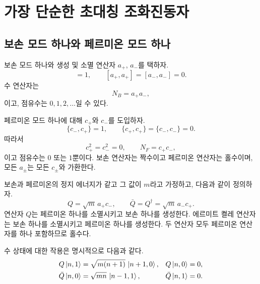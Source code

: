 \section{가장 단순한 초대칭 조화진동자}

\subsection{보손 모드 하나와 페르미온 모드 하나}

보손 모드 하나와 생성 및 소멸 연산자 \(a_+\), \(a_-\)를 택하자.
\begin{equation}
[a_-,a_+]=1,
\qquad
[a_+,a_+]=[a_-,a_-]=0.
\end{equation}
수 연산자는
\begin{equation}
N_B=a_+a_-,
\end{equation}
이고, 점유수는 \(0,1,2,\ldots\)일 수 있다.

페르미온 모드 하나에 대해 \(c_+\)와 \(c_-\)를 도입하자.
\begin{equation}
\{c_-,c_+\}=1,
\qquad
\{c_+,c_+\}=\{c_-,c_-\}=0.
\end{equation}
따라서
\begin{equation}
c_+^2=c_-^2=0,
\qquad
N_F=c_+c_-,
\end{equation}
이고 점유수는 \(0\) 또는 \(1\)뿐이다. 보손 연산자는 짝수이고 페르미온 연산자는 홀수이며, 모든 \(a_\pm\)는 모든 \(c_\pm\)와 가환한다.


보손과 페르미온의 정지 에너지가 같고 그 값이 \(m\)라고 가정하고, 다음과 같이 정의하자.
\begin{equation}
Q=\sqrt m\,a_+c_-,
\qquad
\bar Q=Q^\dagger=\sqrt m\,a_-c_+.
\end{equation}
연산자 \(Q\)는 페르미온 하나를 소멸시키고 보손 하나를 생성한다. 에르미트 켤레 연산자는 보손 하나를 소멸시키고 페르미온 하나를 생성한다. 두 연산자 모두 페르미온 연산자를 하나 포함하므로 홀수다.

수 상태에 대한 작용은 명시적으로 다음과 같다.
\begin{align}
Q\left\lvert n,1\right\rangle
&=\sqrt{m(n+1)}\,\left\lvert n+1,0\right\rangle,
&
Q\left\lvert n,0\right\rangle&=0,\\
\bar Q\left\lvert n,0\right\rangle
&=\sqrt{mn}\,\left\lvert n-1,1\right\rangle,
&
\bar Q\left\lvert n,1\right\rangle&=0.
\end{align}

